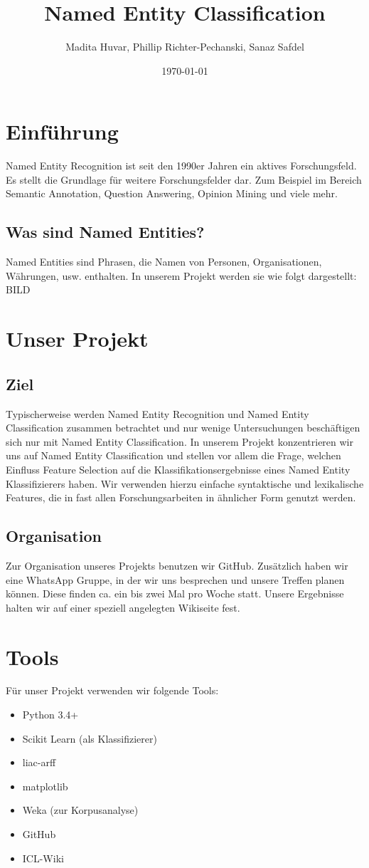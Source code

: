 \documentclass[a4paper, 11pt]{article}
\title{Named Entity Classification}
\author{Madita Huvar, Phillip Richter-Pechanski, Sanaz Safdel}
\date{\today}
\begin{document}
\maketitle
\newpage
\tableofcontents
\newpage
\section{Einführung}
Named Entity Recognition ist seit den 1990er Jahren ein aktives Forschungsfeld. Es stellt die Grundlage für weitere Forschungsfelder dar. Zum Beispiel im Bereich Semantic Annotation, Question Answering, Opinion Mining und viele mehr.
\subsection{Was sind Named Entities?}
Named Entities sind Phrasen, die Namen von Personen, Organisationen, Währungen, usw. enthalten. In unserem Projekt werden sie wie folgt dargestellt:
BILD
\section{Unser Projekt}
\subsection{Ziel}
Typischerweise werden Named Entity Recognition und Named Entity Classification zusammen betrachtet und nur wenige Untersuchungen beschäftigen sich nur mit Named Entity Classification. In unserem Projekt konzentrieren wir uns auf Named Entity Classification und stellen vor allem die Frage, welchen Einfluss Feature Selection auf die Klassifikationsergebnisse eines Named Entity Klassifizierers haben. Wir verwenden hierzu einfache syntaktische und lexikalische Features, die in fast allen Forschungsarbeiten in ähnlicher Form genutzt werden.
\subsection{Organisation}
Zur Organisation unseres Projekts benutzen wir GitHub. Zusätzlich haben wir eine WhatsApp Gruppe, in der wir uns besprechen und unsere Treffen planen können. Diese finden ca. ein bis zwei Mal pro Woche statt. Unsere Ergebnisse halten wir auf einer speziell angelegten Wikiseite fest. 
\section{Tools}
Für unser Projekt verwenden wir folgende Tools:
\begin{itemize}
\item Python 3.4+
\item Scikit Learn (als Klassifizierer)
\item liac-arff
\item matplotlib
\item Weka (zur Korpusanalyse)
\item GitHub
\item ICL-Wiki
\end{itemize}
\end{document}
